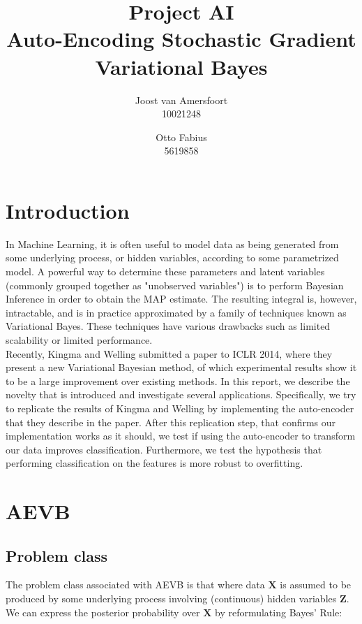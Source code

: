 \documentclass{article}
\begin{document}
\title{Project AI \\ Auto-Encoding Stochastic Gradient Variational Bayes}
\author{	
	Joost van Amersfoort \\ 10021248  
	\and
	Otto Fabius \\ 5619858
	}
\maketitle

\section{Introduction}

In Machine Learning, it is often useful to model data as being generated from some underlying process, or hidden variables, according to some parametrized model. A powerful way to determine these parameters and latent variables (commonly grouped together as "unobserved variables") is to perform Bayesian Inference in order to obtain the MAP estimate. The resulting integral is, however, intractable, and is in practice approximated by a family of techniques known as Variational Bayes. These techniques have various drawbacks such as limited scalability or limited performance. \\
Recently, Kingma and Welling \cite{kingma2013auto} submitted a paper to ICLR 2014, where they present a new Variational Bayesian method, of which experimental results show it to be a large improvement over existing methods. In this report, we describe the novelty that is introduced and investigate several applications. Specifically, we try to replicate the results of Kingma and Welling by implementing the auto-encoder that they describe in the paper. After this replication step, that confirms our implementation works as it should, we test if using the auto-encoder to transform our data improves classification. Furthermore, we test the hypothesis that performing classification on the features is more robust to overfitting. 

\section{AEVB}

\subsection*{Problem class}

The problem class associated with AEVB is that where data $\mathbf{X}$ is assumed to be produced by some underlying process involving (continuous) hidden variables $\mathbf{Z}$. We can express the posterior probability over $\mathbf{X}$ by reformulating Bayes' Rule:
\end{document}
